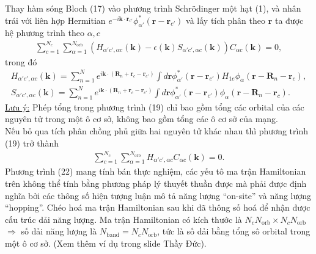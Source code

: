 \documentclass{article}
\newcommand{\dps}{\displaystyle}
\begin{document}
Thay hàm sóng Bloch (17) vào phương trình Schr\"{o}dinger một hạt (1), và nhân trái với liên hợp Hermitian $e^{-i \mathbf{k} \cdot \mathbf{r}_{c'}} \phi_{\alpha'}^{*} (\mathbf{r} - \mathbf{r}_{c'})$ và lấy tích phân theo $\mathbf{r}$ ta được hệ phương trình theo $\alpha, c$
\begin{gather}
	\sum_{c=1}^{N_{c}} \sum_{\alpha=1}^{N_{\text{orb}}} \left(H_{\alpha' c', \alpha c} (\mathbf{k}) -\epsilon(\mathbf{k}) S_{\alpha' c', \alpha c} (\mathbf{k})\right) C_{\alpha c} (\mathbf{k}) = 0,
\end{gather}
trong đó
\begin{gather}
	H_{\alpha' c', \alpha c} (\mathbf{k}) = \sum_{n=1}^{N} e^{i \mathbf{k} \cdot ( \mathbf{R}_{n} + \mathbf{r}_{c} - \mathbf{r}_{c'} )} \dps \int d\mathbf{r} \phi_{\alpha'}^{*} (\mathbf{r} - \mathbf{r}_{c'}) H_{1e} \phi_{\alpha} (\mathbf{r} - \mathbf{R}_{n} - \mathbf{r}_{c}), \\
	S_{\alpha' c', \alpha c} (\mathbf{k}) = \sum_{n=1}^{N} e^{i \mathbf{k} \cdot ( \mathbf{R}_{n} + \mathbf{r}_{c} - \mathbf{r}_{c'} )} \dps \int d\mathbf{r} \phi_{\alpha'}^{*} (\mathbf{r} - \mathbf{r}_{c'}) \phi_{\alpha} (\mathbf{r} - \mathbf{R}_{n} - \mathbf{r}_{c}).
\end{gather}
\underline{Lưu ý:} Phép tổng trong phương trình (19) chỉ bao gồm tổng các orbital của các nguyên tử trong một ô cơ sở, không bao gồm tổng các ô cơ sở của mạng. \\ 
Nếu bỏ qua tích phân chồng phủ giữa hai nguyên tử khác nhau thì phương trình (19) trở thành 
\begin{gather}
	\sum_{c=1}^{N_{c}} \sum_{\alpha=1}^{N_{\text{orb}}} H_{\alpha' c', \alpha c} C_{\alpha c} (\mathbf{k}) = 0.
\end{gather}
Phương trình (22) mang tính bán thực nghiệm, các yếu tô ma trận Hamiltonian trên không thể tính bằng phương pháp lý thuyết thuần được mà phải được định nghĩa bởi các thông số hiện tượng luận mô tả năng lượng ``on-site'' và năng lượng ``hopping''. Chéo hoá ma trận Hamiltonian sau khi đã thông số hoá để nhận được cấu trúc dải năng lượng. Ma trận Hamiltonian có kích thước là $N_{c} N_{\text{orb}} \times N_{c} N_{\text{orb}}$ $\Rightarrow$ số dải năng lượng là $N_{\text{band}} = N_{c} N_{\text{orb}}$, tức là số dải bằng tổng sô orbital trong một ô cơ sở. (Xem thêm ví dụ trong slide Thầy Đức).
























\newpage



	
	
\end{document}
